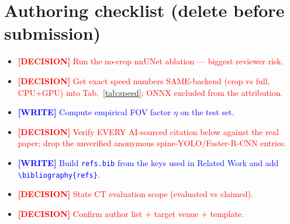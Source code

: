 \documentclass[11pt]{article}
\newcommand{\WRITE}[1]{\textcolor{blue}{\textbf{[WRITE]} #1}}
\newcommand{\DECISION}[1]{\textcolor{red}{\textbf{[DECISION]} #1}}
\begin{document}
\section*{Authoring checklist (delete before submission)}
\begin{itemize}
  \item \DECISION{Run the no-crop nnUNet ablation — biggest reviewer risk.}
  \item \DECISION{Get exact speed numbers SAME-backend (crop vs full, CPU+GPU)
        into Tab.~\ref{tab:speed}; ONNX excluded from the attribution.}
  \item \WRITE{Compute empirical FOV factor $\eta$ on the test set.}
  \item \DECISION{Verify EVERY AI-sourced citation below against the real paper;
        drop the unverified anonymous spine-YOLO/Faster-R-CNN entries.}
  \item \WRITE{Build \texttt{refs.bib} from the keys used in Related Work and add
        \texttt{\textbackslash bibliography\{refs\}}.}
  \item \DECISION{State CT evaluation scope (evaluated vs claimed).}
  \item \DECISION{Confirm author list + target venue + template.}
\end{itemize}
\end{document}
